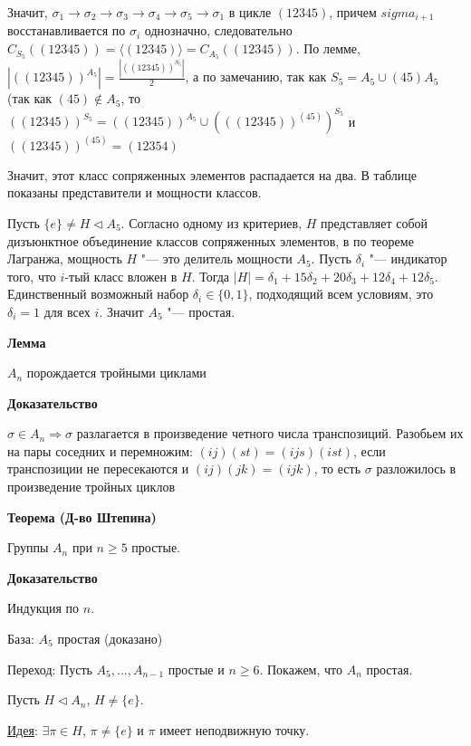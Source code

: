\documentclass{article}
\begin{document}
Значит, $\sigma_1 \rightarrow \sigma_2 \rightarrow \sigma_3 \rightarrow \sigma_4 \rightarrow \sigma_5 \rightarrow \sigma_1$ в цикле $(1 2 3 4 5)$, причем $sigma_{i+1}$ восстанавливается по $\sigma_i$ однозначно, следовательно $C_{S_5}((1 2 3 4 5)) = \langle (1 2 3 4 5) \rangle = C_{A_5}((1 2 3 4 5))$. По лемме, $|((1 2 3 4 5))^{A_5}| = \frac{|((1 2 3 4 5))^{S_5}|}{2}$, а по замечанию, так как  $S_5 = A_5 \cup (4 5)A_5$ (так как $(4 5) \notin A_5$, то $((1 2 3 4 5))^{S_5} = ((1 2 3 4 5))^{A_5} \cup (((1 2 3 4 5))^{(4 5)})^{S_5}$ и $((1 2 3 4 5))^{(4 5)} = (1 2 3 5 4)$

Значит, этот класс сопряженных элементов распадается на два. В таблице показаны представители и мощности классов.

Пусть $\{e\} \neq H \triangleleft A_5$. Согласно одному из критериев, $H$ представляет собой дизъюнктное объединение классов сопряженных элементов, в по теореме Лагранжа, мощность $H$ "--- это делитель мощности $A_5$. Пусть $\delta_i$ "--- индикатор того, что $i$-тый класс вложен в $H$. Тогда $|H| = \delta_1 + 15\delta_2 + 20\delta_3 + 12\delta_4 + 12\delta_5$. Единственный возможный набор $\delta_i \in \{0, 1\}$, подходящий всем условиям, это $\delta_i = 1$ для всех $i$. Значит $A_5$ "--- простая.

\vspace{10pt}

\textbf{Лемма}

$A_n$ порождается тройными циклами  

\textbf{Доказательство}

$\sigma \in A_n \Rightarrow \sigma$ разлагается в произведение четного числа транспозиций. Разобьем их на пары соседних и перемножим: $(i j)(s t) = (i j s)(i s t)$, если транспозиции не пересекаются и $(i j)(j k) = (i j k)$, то есть $\sigma$ разложилось в произведение тройных циклов

\vspace{10pt}

\textbf{Теорема (Д-во Штепина)}

Группы $A_n$ при $n \geq 5$ простые.

\textbf{Доказательство}

Индукция по $n$.

База: $A_5$ простая (доказано)

Переход: Пусть $A_5, ..., A_{n-1}$ простые и $n \geq 6$. Покажем, что $A_n$ простая.

Пусть $H \triangleleft A_n$, $H \neq \{e\}$.

\underline{Идея}: $\exists \pi \in H$, $\pi \neq \{e\}$ и $\pi$ имеет неподвижную точку.
\end{document}
